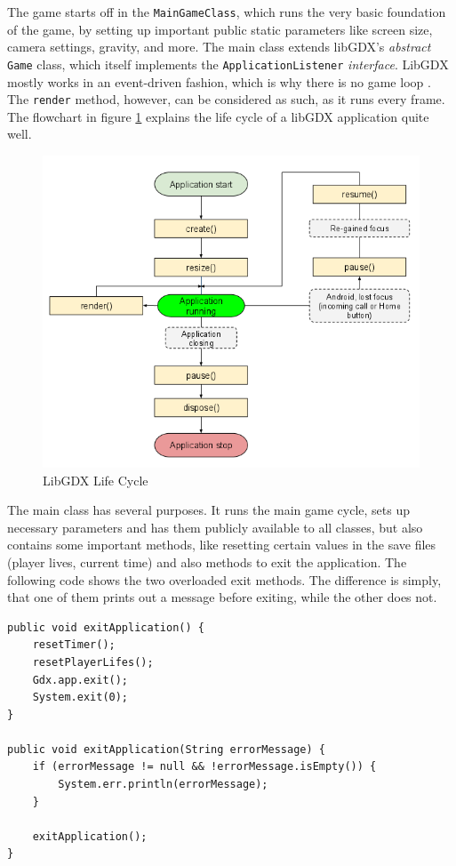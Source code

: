 \documentclass[12p]{article}
\begin{document}
The game starts off in the \texttt{MainGameClass}, which runs the very basic foundation of the game, by setting up important public static parameters like screen size, camera settings, gravity, and more. The main class extends libGDX's \emph{abstract} \texttt{Game} class, which itself implements the \texttt{ApplicationListener} \emph{interface}. LibGDX mostly works in an event-driven fashion, which is why there is no game loop \cite{libGDXLifeCycle}. The \texttt{render} method, however, can be considered as such, as it runs every frame. The flowchart in figure \ref{fig:LibGDXLifeCycle} explains the life cycle of a libGDX application quite well.

\begin{figure}[ht]
  \center
  \includegraphics[width=1\textwidth]{Documentation/lifeCycle}
  \caption{LibGDX Life Cycle \cite{libGDXLifeCycle}}
  \label{fig:LibGDXLifeCycle}
\end{figure}

The main class has several purposes. It runs the main game cycle, sets up necessary parameters and has them publicly available to all classes, but also contains some important methods, like resetting certain values in the save files (player lives, current time) and also methods to exit the application. The following code shows the two overloaded exit methods. The difference is simply, that one of them prints out a message before exiting, while the other does not.

\begin{verbatim}
public void exitApplication() {
	resetTimer();
	resetPlayerLifes();
	Gdx.app.exit();
	System.exit(0);
}

public void exitApplication(String errorMessage) {
	if (errorMessage != null && !errorMessage.isEmpty()) {
		System.err.println(errorMessage);
	}

	exitApplication();
}
\end{verbatim}
\end{document}
